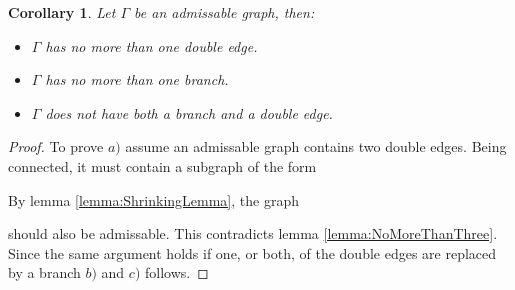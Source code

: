 \documentclass[twoside,utf8]{article}
\theoremstyle{plain}
\newtheorem*{corollary}{Corollary}
\theoremstyle{definition}
\theoremstyle{remark}
\begin{document}
\begin{corollary}
Let $\Gamma$ be an admissable graph, then:
\begin{itemize}
\item[a)] $\Gamma$ has no more than one double edge. 
\item[b)] $\Gamma$ has no more than one branch.
\item[c)] $\Gamma$ does not have both a branch and a double edge. 
\end{itemize}
\end{corollary}
\begin{proof}
To prove $a)$ assume an admissable graph contains two double edges. Being connected, it must contain a subgraph of the form 
\begin{center}
\end{center}
By lemma \ref*{lemma:ShrinkingLemma}, the graph
\begin{center}
\end{center}
should also be admissable. This contradicts lemma \ref*{lemma:NoMoreThanThree}. Since the same argument holds if one, or both, of the double edges are replaced by a branch $b)$ and $c)$ follows.
\end{proof}
\end{document}
